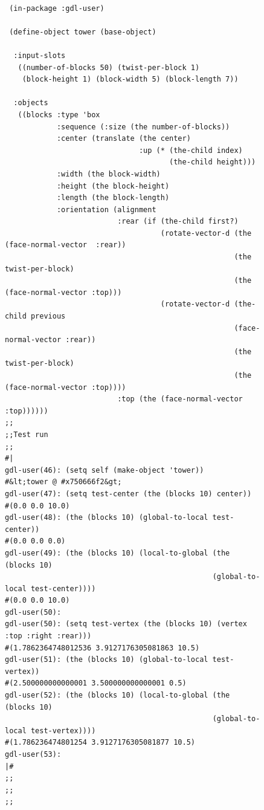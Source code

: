\documentclass [11pt]{book}
\begin{document}
\begin{itemize}
\begin{description}
\end{description}




\begin{figure}
\begin{lrbox}{\boxedverb}
\begin{minipage}{\linewidth}
{\small

\begin{verbatim}

 (in-package :gdl-user)

 (define-object tower (base-object)
  
  :input-slots 
   ((number-of-blocks 50) (twist-per-block 1)
    (block-height 1) (block-width 5) (block-length 7))
  
  :objects
   ((blocks :type 'box
            :sequence (:size (the number-of-blocks))
            :center (translate (the center) 
                               :up (* (the-child index) 
                                      (the-child height)))
            :width (the block-width) 
            :height (the block-height) 
            :length (the block-length)
            :orientation (alignment 
                          :rear (if (the-child first?)
                                    (rotate-vector-d (the (face-normal-vector  :rear))
                                                     (the twist-per-block)
                                                     (the (face-normal-vector :top)))
                                    (rotate-vector-d (the-child previous 
                                                     (face-normal-vector :rear))
                                                     (the twist-per-block)
                                                     (the (face-normal-vector :top))))
                          :top (the (face-normal-vector :top))))))
;;
;;Test run
;;
#|
gdl-user(46): (setq self (make-object 'tower))
#&lt;tower @ #x750666f2&gt;
gdl-user(47): (setq test-center (the (blocks 10) center))
#(0.0 0.0 10.0)
gdl-user(48): (the (blocks 10) (global-to-local test-center))
#(0.0 0.0 0.0)
gdl-user(49): (the (blocks 10) (local-to-global (the (blocks 10) 
                                                (global-to-local test-center))))
#(0.0 0.0 10.0)
gdl-user(50): 
gdl-user(50): (setq test-vertex (the (blocks 10) (vertex :top :right :rear)))
#(1.7862364748012536 3.9127176305081863 10.5)
gdl-user(51): (the (blocks 10) (global-to-local test-vertex))
#(2.500000000000001 3.500000000000001 0.5)
gdl-user(52): (the (blocks 10) (local-to-global (the (blocks 10) 
                                                (global-to-local test-vertex))))
#(1.786236474801254 3.9127176305081877 10.5)
gdl-user(53): 
|#
;;
;;
;;



\end{verbatim}}
\end{minipage}
\end{lrbox}
\end{figure}
\end{itemize}
\end{document}

